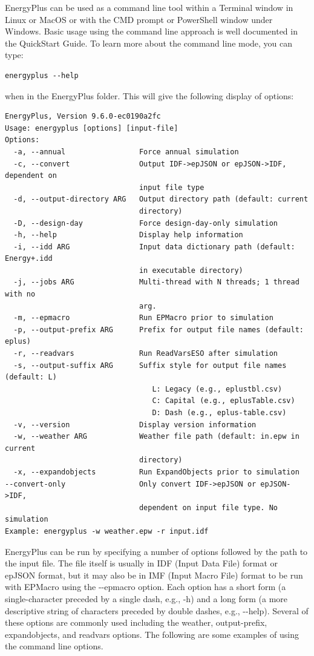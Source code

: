 EnergyPlus can be used as a command line tool within a Terminal window
in Linux or MacOS or with the CMD prompt or PowerShell window under
Windows. Basic usage using the command line approach is well documented
in the QuickStart Guide. To learn more about the command line mode,
you can type:
\begin{verbatim}
energyplus --help
\end{verbatim}
when in the EnergyPlus folder. This will give the following display
of options:
\begin{verbatim}
EnergyPlus, Version 9.6.0-ec0190a2fc
Usage: energyplus [options] [input-file]
Options:
  -a, --annual                 Force annual simulation
  -c, --convert                Output IDF->epJSON or epJSON->IDF, dependent on
                               input file type
  -d, --output-directory ARG   Output directory path (default: current
                               directory)
  -D, --design-day             Force design-day-only simulation
  -h, --help                   Display help information
  -i, --idd ARG                Input data dictionary path (default: Energy+.idd
                               in executable directory)
  -j, --jobs ARG               Multi-thread with N threads; 1 thread with no
                               arg.
  -m, --epmacro                Run EPMacro prior to simulation
  -p, --output-prefix ARG      Prefix for output file names (default: eplus)
  -r, --readvars               Run ReadVarsESO after simulation
  -s, --output-suffix ARG      Suffix style for output file names (default: L)
                                  L: Legacy (e.g., eplustbl.csv)
                                  C: Capital (e.g., eplusTable.csv)
                                  D: Dash (e.g., eplus-table.csv)
  -v, --version                Display version information
  -w, --weather ARG            Weather file path (default: in.epw in current
                               directory)
  -x, --expandobjects          Run ExpandObjects prior to simulation
--convert-only                 Only convert IDF->epJSON or epJSON->IDF,
                               dependent on input file type. No simulation
Example: energyplus -w weather.epw -r input.idf
\end{verbatim}
EnergyPlus can be run by specifying a number of options followed by
the path to the input file. The file itself is usually in IDF (Input
Data File) format or epJSON format, but it may also be in IMF (Input
Macro File) format to be run with EPMacro using the -{}-epmacro option.
Each option has a short form (a single-character preceded by a single
dash, e.g., \textquotedbl -h\textquotedbl ) and a long form (a more
descriptive string of characters preceded by double dashes, e.g.,
\textquotedbl -{}-help\textquotedbl ). Several of these options
are commonly used including the weather, output-prefix, expandobjects,
and readvars options. The following are some examples of using the
command line options.

